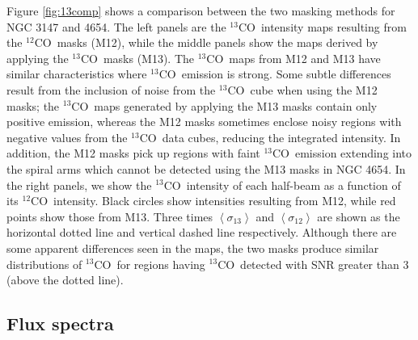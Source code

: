\documentclass{emulateapj}
\def\ttco{\mbox{$^{13}$CO}}
\def\twco{\mbox{$^{12}$CO}}
\begin{document}
Figure \ref{fig:13comp} shows a comparison 
between the two masking methods for NGC 3147 and 4654.
The left panels are the \ttco \ intensity maps 
resulting from the \twco \ masks (M12), while the middle 
panels show the maps derived by applying the \ttco \ masks (M13).
The \ttco \ maps from M12 and M13 have similar
characteristics where \ttco \ emission is strong. 
Some subtle differences result from the
 inclusion of noise from the \ttco \ cube when using the M12 masks; 
the \ttco \ maps generated by applying the M13 masks contain only positive emission, 
whereas the M12 masks sometimes enclose noisy regions
with negative values from the \ttco \ data cubes, 
reducing the integrated intensity. 
In addition, the M12 masks pick up regions with
faint \ttco \ emission extending into the spiral arms 
which cannot be detected using the M13 masks in NGC 4654. 
In the right panels, we show the \ttco \ intensity  
of each half-beam as a function of its \twco \ intensity.
Black circles show intensities resulting from M12, 
while red points show those from M13. 
Three times $\left<\sigma_{13}\right>$ and $\left<\sigma_{12}\right>$ are
shown as the horizontal dotted line and vertical dashed line
respectively.  
Although there are some apparent differences seen in the maps,  
the two masks produce similar distributions of 
\ttco \  for regions having \ttco \ detected with 
SNR greater than 3 (above the dotted line). 


\subsection{Flux spectra}\label{sec:spectra}

\begin{figure*}[t!]
\caption{
  Total flux spectra plotted as a function of offset from the 
  systemic velocity. Black lines show  the total flux of \twco. Blue
  lines show the \ttco \ flux spectra with the same \twco \ mask (M12), and 
  the red lines are the \ttco \ flux spectra obtained using the \ttco \ mask (M13). 
  The \ttco \ fluxes are scaled by a factor of 5 for clarity. 
}
\label{fig:spectra}
\end{figure*}
\end{document}
